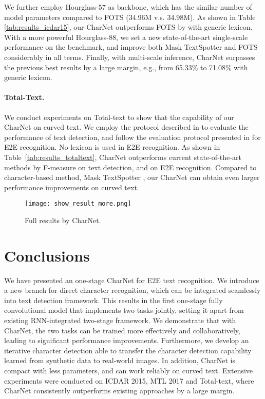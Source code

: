 \documentclass[10pt,twocolumn,letterpaper]{article}
\begin{document}
We further employ Hourglass-57 \cite{law2018cornernet} as backbone, which has the similar number of model parameters compared to FOTS (34.96M v.s. 34.98M). As shown in Table \ref{tab:results_icdar15}, our CharNet outperforms FOTS by  with generic lexicon. With a more powerful Hourglass-88, we set a new state-of-the-art single-scale performance on the benchmark, and improve both Mask TextSpotter and FOTS considerably in all terms. Finally, with multi-scale inference, CharNet surpasses the previous best results \cite{liu2018fots} by a large margin, e.g., from 65.33\% to 71.08\% with generic lexicon.

\paragraph{Total-Text.} We conduct experiments on Total-text to show that the capability of our CharNet on curved text. We employ the protocol described in \cite{ch2017total} to evaluate the performance of text detection, and follow the evaluation protocol presented in \cite{lyu2018mask} for E2E recognition. No lexicon is used in E2E recognition. As shown in Table~\ref{tab:results_totaltext}, CharNet outperforms current state-of-the-art methods by  F-measure on text detection, and  on E2E recognition.
Compared to character-based method, Mask TextSpotter \cite{lyu2018mask}, our CharNet can obtain even larger performance improvements on curved text.

\begin{figure}[!t]
    \begin{center}
        \texttt{[image: show\_result\_more.png]}
    \end{center}
    \vspace{-5mm}
    \caption{Full results by CharNet.}
    \label{fig:show_more_result}
\end{figure}




\section{Conclusions}
We have presented an one-stage CharNet for E2E text recognition. We introduce a new branch for direct character recognition, which can be integrated seamlessly into text detection framework. This results in the first one-stage fully convolutional model that implements two tasks jointly, setting it apart from existing RNN-integrated two-stage framework. We demonstrate that with CharNet, the two tasks can be trained more effectively and collaboratively, leading to significant performance improvements. Furthermore, we develop an iterative character detection able to transfer the character detection capability learned from synthetic data to real-world images.
In addition, CharNet is compact with less parameters, and can work reliably on curved text.
Extensive experiments were conducted on ICDAR 2015, MTL 2017 and Total-text, where CharNet consistently outperforms existing approaches by a large margin.

{


}
\end{document}
